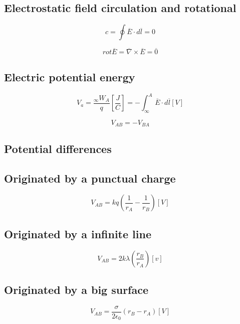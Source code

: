 \documentclass[letterpaper]{article}
\newcommand{\divline}{\noindent\makebox[\linewidth]{\rule{\textwidth}{0.4pt}}}
\begin{document}
    \divline
    \begin{multicols}{2}
        \section{Electrostatic field circulation and rotational}
        \[c = \oint \overline{E} \cdot d \overline{l} = 0\]

        \[rot \overline{E} = \overline{\nabla} \times \overline{E} = \overline{0}\]
    \end{multicols}

    \divline
    \begin{multicols}{2}
        \section{Electric potential energy}

        \[V_{a} = \frac{_{\infty} W_{A}}{q} \left[ \frac{J}{C} \right] = - \int_{\infty}^{A} \overline{E} \cdot d \overline{l} \left[ V \right] \]

        \[V_{AB} = - V_{BA}\]
    \end{multicols}

    \divline
    \begin{multicols}{2}
        \section{Potential differences}

        \subsection{Originated by a punctual charge}

        \[V_{AB} = kq \left( \frac{1}{r_{A}} - \frac{1}{r_{B}} \right) [V]\]

        \subsection{Originated by a infinite line}

        \[V_{AB} = 2k\lambda \left( \frac{r_{B}}{r_{A}} \right) [v]\]

        \subsection{Originated by a big surface}

        \[V_{AB} = \frac{\sigma}{2 \epsilon_{0}} (r_{B} - r_{A}) [V]\]
    \end{multicols}
\end{document}
